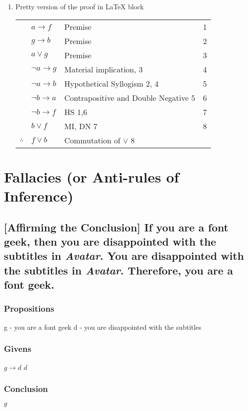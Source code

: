\documentclass[11pt]{article}
\begin{document}
\begin{enumerate}
\item Pretty version of the proof in \LaTeX{} block
\label{sec:orgbda49ce}
\begin{LaTeX}
\begin{tabular}{lllr}
  &$a \rightarrow f$&Premise&1\\
  &$g \rightarrow b$&Premise&2\\
  &$a \lor g$&Premise&3\\
  &$\lnot a \rightarrow g$&Material implication, 3&4\\
  &$\lnot a \rightarrow b$&Hypothetical Syllogism 2, 4&5\\
  &$\lnot b \rightarrow a$&Contrapositive and Double Negative 5&6\\
  &$\lnot b \rightarrow f$&HS 1,6&7\\
  &$b \lor f$&MI, DN 7&8\\\cline{2-3}
  $\therefore$&$f \lor b$&Commutation of $\lor$ 8&\\
\end{tabular}
\end{LaTeX}
\end{enumerate}

\section{Fallacies (or Anti-rules of Inference)}
\label{sec:org886eab3}
\subsection{[Affirming the Conclusion] If you are a font geek, then you are disappointed with the subtitles in \emph{Avatar}. You are disappointed with the subtitles in \emph{Avatar}. Therefore, you are a font geek.}
\label{sec:orgb1edd6a}

\subsubsection{Propositions}
\label{sec:org70604f5}
g - you are a font geek
d - you are disappointed with the subtitles
\subsubsection{Givens}
\label{sec:orgdbaee70}
\(g \rightarrow d\)
\(d\)
\subsubsection{Conclusion}
\label{sec:org2347765}
\(g\)
\end{document}
